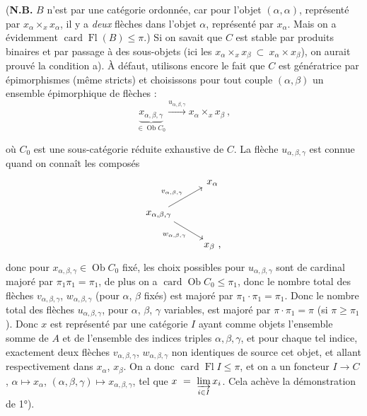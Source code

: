 \documentclass[11pt]{article}
\newcommand{\printedpage}[1]{\marginpar{\footnotesize p.~#1}}
\newcommand{\msp}[1]{\marginpar{\footnotesize [#1]}}
\newcommand{\card}{\operatorname{card}}
\newcommand{\Fl}{\operatorname{Fl}}
\newcommand{\Ob}{\operatorname{Ob}}
\begin{document}
(\textbf{N.B.} $B$ n'est par une catégorie ordonnée, car pour l'objet $(\alpha,\alpha)$, représenté par $x_{\alpha}\times_x x_{\alpha}$, %
il y a \textit{deux} flèches dans l'objet $\alpha$, représenté par $x_{\alpha}$. Mais on a évidemment $\card \Fl(B) \leqslant \pi$.) Si on savait que $C$ est stable par produits binaires et par passage à des sous-objets (ici les $x_{\alpha} \times_x x_{\beta} \ \subset \ x_{\alpha} \times x_{\beta}$), on aurait prouvé la condition a). À défaut, utilisons encore le fait que $C$ est génératrice par épimorphismes (même stricts) et choisissons pour tout couple $(\alpha,\beta)$ un ensemble épimorphique de flèches :
\[ \underbrace{x_{\alpha,\beta,\gamma}}_{\in \Ob C_0} \xrightarrow{u_{\alpha,\beta,\gamma}} x_{\alpha} \times_x x_{\beta} \ , \]

\printedpage{41}
où $C_0$ est une sous-catégorie réduite exhaustive de $C$. La flèche $u_{\alpha,\beta,\gamma}$ est connue quand on connaît les composés
\msp{page 131}
\[
\begin{tikzcd}
& x_{\alpha} \\
x_{\alpha,\beta,\gamma} \arrow[ur, "v_{\alpha,\beta,\gamma}"] \arrow[dr, "w_{\alpha,\beta,\gamma}"'] & \\
& x_{\beta} \text{ ,}
\end{tikzcd}
\]
donc pour $x_{\alpha,\beta,\gamma} \in \Ob C_0$ fixé, les choix possibles pour $u_{\alpha,\beta,\gamma}$ sont de cardinal majoré par $\pi_1\pi_1 = \pi_1$, de plus on a $\card \Ob C_0 \leqslant \pi_1$, donc le nombre total des flèches $v_{\alpha,\beta,\gamma}$, $w_{\alpha,\beta,\gamma}$ (pour $\alpha$, $\beta$ fixés) est majoré par $\pi_1 \cdot \pi_1 = \pi_1$. Donc le nombre total des flèches $u_{\alpha,\beta,\gamma}$, pour $\alpha$, $\beta$, $\gamma$ variables, est majoré par $\pi \cdot \pi_1 = \pi$ (si $\pi \geqslant \pi_1$). Donc $x$ est représenté par une catégorie $I$ ayant comme objets l'ensemble somme de $A$ et de l'ensemble des indices triples $\alpha,\beta,\gamma$, et pour chaque tel indice, exactement deux flèches $v_{\alpha,\beta,\gamma}$, $w_{\alpha,\beta,\gamma}$ non identiques de source cet objet, et allant respectivement dans $x_{\alpha}$, $x_{\beta}$. On a donc $\card \Fl I \leqslant \pi$, et on a un foncteur $I \longrightarrow C$, $\alpha \longmapsto x_{\alpha}$, $(\alpha,\beta,\gamma) \longmapsto x_{\alpha,\beta,\gamma}$, tel que $x \ = \ \varinjlim\limits_{i\in I} x_i$. Cela achève la démonstration de 1°).
\end{document}
